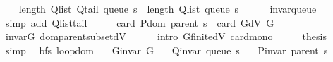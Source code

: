 \begin{isabellebody}
\ \ \isamarkupfalse%
\ {\isachardoublequoteopen}length\ {\isacharparenleft}{\kern0pt}Q{\isacharunderscore}{\kern0pt}list\ {\isacharparenleft}{\kern0pt}Q{\isacharunderscore}{\kern0pt}tail\ {\isacharparenleft}{\kern0pt}queue\ s{\isacharparenright}{\kern0pt}{\isacharparenright}{\kern0pt}{\isacharparenright}{\kern0pt}\ {\isacharless}{\kern0pt}\ length\ {\isacharparenleft}{\kern0pt}Q{\isacharunderscore}{\kern0pt}list\ {\isacharparenleft}{\kern0pt}queue\ s{\isacharparenright}{\kern0pt}{\isacharparenright}{\kern0pt}{\isachardoublequoteclose}\isanewline
\ \ \ \ \isamarkupfalse%
\ invar{\isacharunderscore}{\kern0pt}queue\isanewline
\ \ \ \ \isamarkupfalse%
\ {\isacharparenleft}{\kern0pt}simp\ add{\isacharcolon}{\kern0pt}\ Q{\isachardot}{\kern0pt}list{\isacharunderscore}{\kern0pt}tail{\isacharparenright}{\kern0pt}\isanewline
\ \ \isamarkupfalse%
\ \isamarkupfalse%
\ {\isachardoublequoteopen}card\ {\isacharparenleft}{\kern0pt}P{\isachardot}{\kern0pt}dom\ {\isacharparenleft}{\kern0pt}parent\ s{\isacharparenright}{\kern0pt}{\isacharparenright}{\kern0pt}\ {\isasymle}\ card\ {\isacharparenleft}{\kern0pt}G{\isachardot}{\kern0pt}dV\ G{\isacharparenright}{\kern0pt}{\isachardoublequoteclose}\isanewline
\ \ \ \ \isamarkupfalse%
\ invar{\isacharunderscore}{\kern0pt}G\ dom{\isacharunderscore}{\kern0pt}parent{\isacharunderscore}{\kern0pt}subset{\isacharunderscore}{\kern0pt}dV\isanewline
\ \ \ \ \isamarkupfalse%
\ {\isacharparenleft}{\kern0pt}intro\ G{\isachardot}{\kern0pt}finite{\isacharunderscore}{\kern0pt}dV\ card{\isacharunderscore}{\kern0pt}mono{\isacharparenright}{\kern0pt}\isanewline
\ \ \isamarkupfalse%
\ \isamarkupfalse%
\ {\isacharquery}{\kern0pt}thesis\isanewline
\ \ \ \ \isamarkupfalse%
\ simp\isanewline
{}\isamarkupfalse%
%
\endisatagproof
{\isafoldproof}%
%
\isadelimproof
\isanewline
%
\endisadelimproof
\isanewline
{}\isamarkupfalse%
\ {\isacharparenleft}{\kern0pt}\ bfs{\isacharparenright}{\kern0pt}\ loop{\isacharunderscore}{\kern0pt}dom{\isacharcolon}{\kern0pt}\isanewline
\ \ \ {\isachardoublequoteopen}G{\isachardot}{\kern0pt}invar\ G{\isachardoublequoteclose}\isanewline
\ \ \ {\isachardoublequoteopen}Q{\isacharunderscore}{\kern0pt}invar\ {\isacharparenleft}{\kern0pt}queue\ s{\isacharparenright}{\kern0pt}{\isachardoublequoteclose}\isanewline
\ \ \ {\isachardoublequoteopen}P{\isacharunderscore}{\kern0pt}invar\ {\isacharparenleft}{\kern0pt}parent\ s{\isacharparenright}{\kern0pt}{\isachardoublequoteclose}\isanewline

\end{isabellebody}
